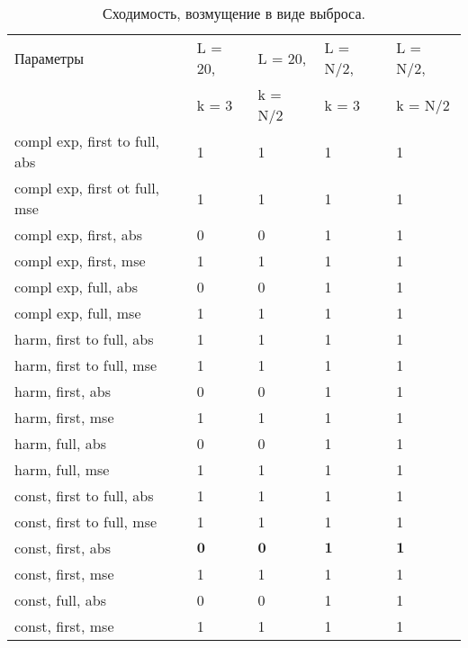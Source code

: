 \documentclass[specialist,
               substylefile = spbu.rtx,
               subf,href,colorlinks=true, 12pt]{disser}
\begin{document}
\begin{table}[H]
    \centering
    \caption{Сходимость, возмущение в виде выброса.}
    \label{tab:conv_outl}
    \begin{tabular}{|l|l|l|l|l|}
    \hline
        Параметры & L = 20, & L = 20, & L = N/2, & L = N/2, \\
        & k = 3 & k = N/2 & k = 3 & k = N/2 \\
        \hline
        compl exp, first to full, abs & 1 & 1 & 1 & 1 \\ \hline
        compl exp, first ot full, mse & 1 & 1 & 1 & 1 \\ \hline
        compl exp, first, abs & 0 & 0 & 1 & 1 \\ \hline
        compl exp, first, mse & 1 & 1 & 1 & 1 \\ \hline
        compl exp, full, abs & 0 & 0 & 1 & 1 \\ \hline
        compl exp, full, mse & 1 & 1 & 1 & 1 \\ \hline
        harm, first to full, abs & 1 & 1 & 1 & 1 \\ \hline
        harm, first to full, mse & 1 & 1 & 1 & 1 \\ \hline
        harm, first, abs & 0 & 0 & 1 & 1 \\ \hline
        harm, first, mse & 1 & 1 & 1 & 1 \\ \hline
        harm, full, abs & 0 & 0 & 1 & 1 \\ \hline
        harm, full, mse & 1 & 1 & 1 & 1 \\ \hline
        const, first to full, abs & 1 & 1 & 1 & 1 \\ \hline
        const, first to full, mse & 1 & 1 & 1 & 1 \\ \hline
        const, first, abs & $\mathbf{0}$ & $\mathbf{0}$ & $\mathbf{1}$ & $\mathbf{1}$ \\ \hline
        const, first, mse & 1 & 1 & 1 & 1 \\ \hline
        const, full, abs & 0 & 0 & 1 & 1 \\ \hline
        const, first, mse & 1 & 1 & 1 & 1 \\ \hline
    \end{tabular}
\end{table}
\end{document}
